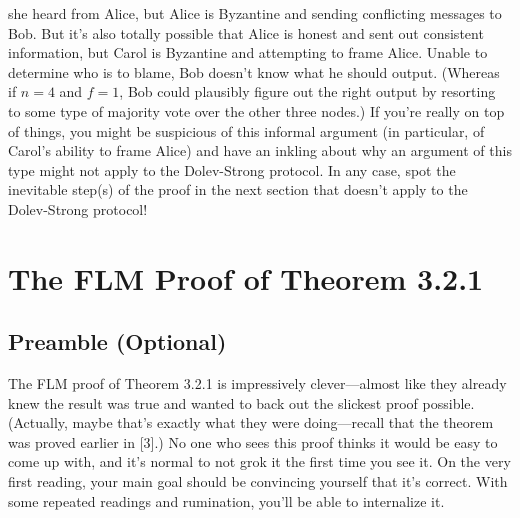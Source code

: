 she heard from Alice, but Alice is Byzantine and sending conflicting messages to Bob. But
it’s also totally possible that Alice is honest and sent out consistent information, but Carol
is Byzantine and attempting to frame Alice. Unable to determine who is to blame, Bob
doesn’t know what he should output. (Whereas if $n = 4$ and $f = 1$, Bob could plausibly
figure out the right output by resorting to some type of majority vote over the other three
nodes.)
If you’re really on top of things, you might be suspicious of this informal argument (in
particular, of Carol’s ability to frame Alice) and have an inkling about why an argument
of this type might not apply to the Dolev-Strong protocol. In any case, spot the inevitable
step(s) of the proof in the next section that doesn’t apply to the Dolev-Strong protocol!

\section{The FLM Proof of Theorem 3.2.1}
\subsection{Preamble (Optional)}
The FLM proof of Theorem 3.2.1 is impressively clever—almost like they already knew the
result was true and wanted to back out the slickest proof possible. (Actually, maybe that’s
exactly what they were doing—recall that the theorem was proved earlier in [3].) No one
who sees this proof thinks it would be easy to come up with, and it’s normal to not grok it
the first time you see it. On the very first reading, your main goal should be convincing yourself that it’s correct. With some repeated readings and rumination, you’ll be able to internalize it.\\


